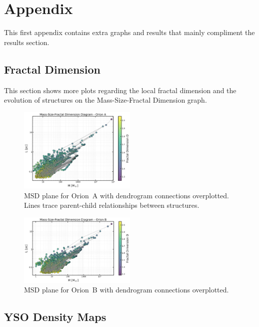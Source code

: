 \chapter{Appendix}

This first appendix contains extra graphs and results that mainly compliment the results section. 
\section{Fractal Dimension}

This section shows more plots regarding the local fractal dimension and the evolution of structures on the Mass-Size-Fractal Dimension graph.
\begin{figure}[h]
    \centering
    \includegraphics[width=0.5\textwidth]{figures/MSD_Orion_A_with_lines.png}
    \caption{MSD plane for Orion~A with dendrogram connections overplotted. Lines trace parent-child relationships between structures.}
    \label{fig:MSD_orion_A_lines}
\end{figure}

\begin{figure}[h]
    \centering
    \includegraphics[width=0.5\textwidth]{figures/MSD_Orion_B_with_lines.png}
    \caption{MSD plane for Orion~B with dendrogram connections overplotted.}
    \label{fig:MSD_orion_B_lines}
\end{figure}

\section{YSO Density Maps}

